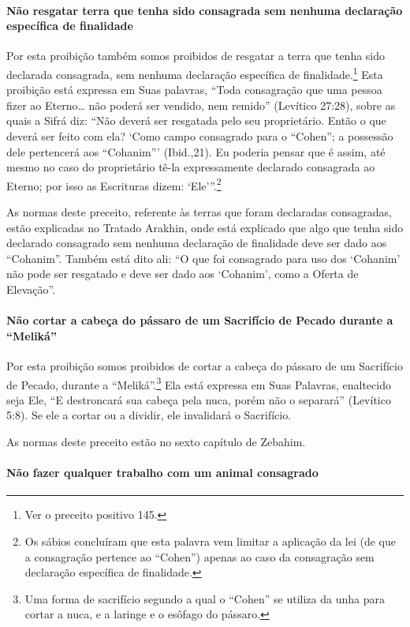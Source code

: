 \paragraph{Não resgatar terra que tenha sido consagrada sem nenhuma declaração
específica de finalidade}

Por esta proibição também somos proibidos de resgatar a terra que tenha
sido declarada consagrada, sem nenhuma declaração específica de
finalidade.\footnote{Ver o preceito positivo 145.} Esta proibição está expressa em Suas
palavras, ``Toda consagração que uma pessoa fizer ao Eterno\ldots{} não
poderá ser vendido, nem remido'' (Levítico 27:28), sobre as quais a
Sifrá diz: ``Não deverá ser resgatada pelo seu proprietário. Então o que
deverá ser feito com ela? `Como campo consagrado para o ``Cohen''; a
possessão dele pertencerá aos ``Cohanim''' (Ibid.,21). Eu poderia pensar
que é assim, até mesmo no caso do proprietário tê-la expressamente
declarado consagrada ao Eterno; por isso as Escrituras dizem:
`Ele'''.\footnote{Os sábios concluíram que esta palavra vem limitar a aplicação da
lei (de que a consagração pertence ao ``Cohen'') apenas ao caso da
consagração sem declaração específica de finalidade.}

As normas deste preceito, referente às terras que foram declaradas
consagradas, estão explicadas no Tratado Arakhin, onde está explicado
que algo que tenha sido declarado consagrado sem nenhuma declaração de
finalidade deve ser dado aos ``Cohanim''. Também está dito ali: ``O que
foi consagrado para uso dos `Cohanim' não pode ser resgatado e deve ser
dado aos `Cohanim', como a Oferta de Elevação''.

\paragraph{Não cortar a cabeça do pássaro de um Sacrifício de Pecado durante a ``Meliká''}

Por esta proibição somos proibidos de cortar a cabeça do pássaro de um
Sacrifício de Pecado, durante a ``Meliká''.\footnote{Uma forma de sacrifício segundo a qual o ``Cohen'' se utiliza da
unha para cortar a nuca, e a laringe e o esôfago do pássaro.} Ela
está expressa em Suas Palavras, enaltecido seja Ele, ``E destroncará sua
cabeça pela nuca, porém não o separará'' (Levítico 5:8). Se ele a cortar
ou a dividir, ele invalidará o Sacrifício.

As normas deste preceito estão no sexto capítulo de Zebahim.

\paragraph{Não fazer qualquer trabalho com um animal consagrado}

